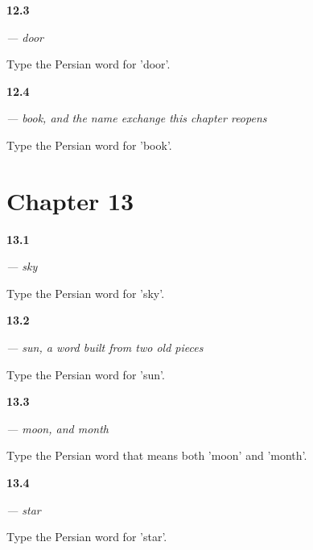 \noindent\begin{minipage}[t]{\linewidth}
\raggedright
\hypertarget{review-FA-C12-dar-meaning}{\textbf{12.3}} \emph{ — door}\par
\small Type the Persian word for 'door'.
\end{minipage}\par\medskip

\noindent\begin{minipage}[t]{\linewidth}
\raggedright
\hypertarget{review-FA-C12-ketab-request}{\textbf{12.4}} \emph{ — book, and the name exchange this chapter reopens}\par
\small Type the Persian word for 'book'.
\end{minipage}\par\medskip

\section*{Chapter 13}

\noindent\begin{minipage}[t]{\linewidth}
\raggedright
\hypertarget{review-FA-C13-aseman-meaning}{\textbf{13.1}} \emph{ — sky}\par
\small Type the Persian word for 'sky'.
\end{minipage}\par\medskip

\noindent\begin{minipage}[t]{\linewidth}
\raggedright
\hypertarget{review-FA-C13-khorshid-meaning}{\textbf{13.2}} \emph{ — sun, a word built from two old pieces}\par
\small Type the Persian word for 'sun'.
\end{minipage}\par\medskip

\noindent\begin{minipage}[t]{\linewidth}
\raggedright
\hypertarget{review-FA-C13-mah-meaning}{\textbf{13.3}} \emph{ — moon, and month}\par
\small Type the Persian word that means both 'moon' and 'month'.
\end{minipage}\par\medskip

\noindent\begin{minipage}[t]{\linewidth}
\raggedright
\hypertarget{review-FA-C13-setare-meaning}{\textbf{13.4}} \emph{ — star}\par
\small Type the Persian word for 'star'.
\end{minipage}\par\medskip

